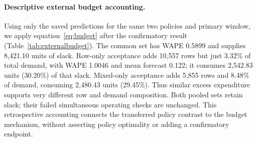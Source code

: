 \paragraph{Descriptive external budget accounting.}
Using only the saved predictions for the same two policies and primary window, we apply equation~\eqref{eq:budget} after the confirmatory result (Table~\ref{tab:externalbudget}). The common set has WAPE 0.5899 and supplies 8,421.10 units of slack. Row-only acceptance adds 10,557 rows but just 3.32\% of total demand, with WAPE 1.0046 and mean forecast 0.122; it consumes 2,542.83 units (30.20\%) of that slack. Mixed-only acceptance adds 5,855 rows and 8.48\% of demand, consuming 2,480.43 units (29.45\%). Thus similar excess expenditure supports very different row and demand composition. Both pooled sets retain slack; their failed simultaneous operating checks are unchanged. This retrospective accounting connects the transferred policy contrast to the budget mechanism, without asserting policy optimality or adding a confirmatory endpoint.
